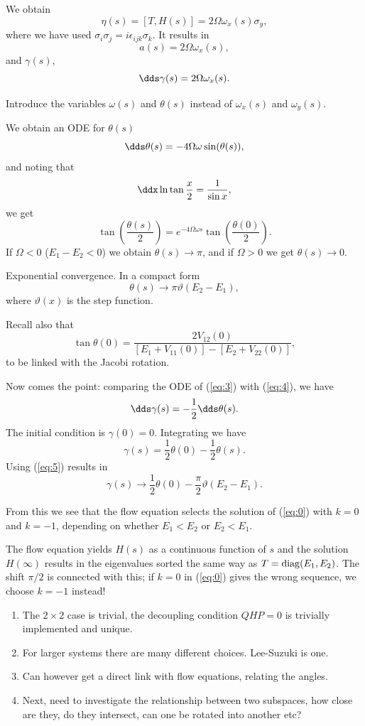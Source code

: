 We obtain
\[ \eta(s) = [T, H(s)] = 2\Omega\omega_x(s)\sigma_y, \]
where we have used $\sigma_i\sigma_j = i\epsilon_{ijk}\sigma_k$.
It results in
\[ a(s) = 2\Omega \omega_x(s), \]
and $\gamma(s)$,
\begin{equation} \dds \gamma(s) = 2\Omega\omega_x(s). \label{eq:3}\end{equation}

Introduce the  variables $\omega(s)$ and $\theta(s)$ instead of
$\omega_x(s)$ and $\omega_y(s)$. 

We obtain an ODE for $\theta(s)$ 
\begin{equation} \dds \theta(s) = -4\Omega\omega \sin(\theta(s)), \label{eq:4}\end{equation}
and noting that
\[ \ddx \ln \tan \frac{x}{2} = \frac{1}{\sin x}, \]
we get
\[ \tan\left(\frac{\theta(s)}{2}\right) = e^{-4\Omega\omega s} \tan\left(
  \frac{\theta(0)}{2}\right). \]
If $\Omega<0$ ($E_1-E_2<0$) we obtain  $\theta(s)\rightarrow \pi$, and if 
$\Omega>0$ we get  $\theta(s)\rightarrow 0$. 

Exponential convergence. In a compact form
\begin{equation} \theta(s) \rightarrow \pi \vartheta(E_2 - E_1),
  \label{eq:5} \end{equation}
where $\vartheta(x)$ is the  step function.

Recall also that 
\[ \tan \theta(0) = \frac{2 V_{12}(0) }{[E_1 + V_{11}(0)]- [E_2 +
  V_{22}(0)]},
\]
to be linked with the Jacobi  rotation.

Now comes the point: comparing the  ODE of (\ref{eq:3}) with 
(\ref{eq:4}), we have
\[ \dds \gamma(s) = -\frac{1}{2} \dds \theta(s). \]
The initial condition is 
$\gamma(0) = 0$. Integrating we have
\[ \gamma(s) = \frac{1}{2}\theta(0) - \frac{1}{2}\theta(s). \]
Using (\ref{eq:5}) results in 
\[ \gamma(s) \rightarrow \frac{1}{2}\theta(0) -
\frac{\pi}{2}\vartheta(E_2-E_1). \]

From this we see that the flow equation selects the solution of (\ref{eq:0}) with
$k=0$ and $k=-1$, depending on whether  $E_1<E_2$ or
$E_2<E_1$.

The flow equation yields $H(s)$ as a continuous function of $s$ and the solution
$H(\infty)$ results in the eigenvalues sorted the same way as
$T = \mathrm{diag}(E_1,E_2)$. The shift $\pi/2$ is connected with this; if $k=0$ in 
(\ref{eq:0}) gives the wrong sequence, we choose $k=-1$ instead!

\begin{enumerate}
\item The $2\times 2$ case is trivial, the decoupling condition $QHP=0$  is trivially implemented and 
unique.  
\item For larger systems there are many different choices. Lee-Suzuki is one.
\item Can however get a direct link with flow equations, relating the angles.
\item Next, need to investigate the relationship between two subspaces, how close are they, do they 
intersect, can one be rotated into another etc?  
    \end{enumerate}
